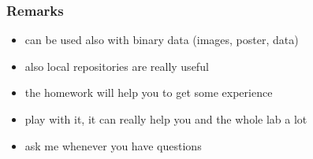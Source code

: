 \documentclass{beamer}
\begin{document}
\begin{frame}
	\frametitle{Remarks}

	\begin{itemize}
		\item<1-> can be used also with binary data (images, poster, data)
		\item<2-> also local repositories are really useful
		\item<3-> the homework will help you to get some experience
		\item<4-> play with it, it can really help you and the whole lab a lot
		\item<5-> ask me whenever you have questions
	\end{itemize}
		
\end{frame}
\end{document}
